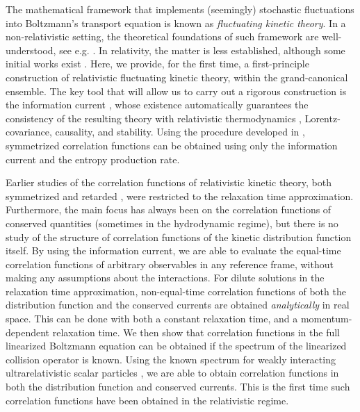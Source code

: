 \documentclass[aps,prd,preprint,nofootinbib,amsmath,amssymb,showpacs,longbibliography,singlecolumn,superscriptaddress,10pt]{revtex4-1}
\theoremstyle{plain}
\theoremstyle{definition}
\begin{document}
The mathematical framework that implements (seemingly) stochastic fluctuations into Boltzmann's transport equation is known as \textit{fluctuating kinetic theory}. In a non-relativistic setting, the theoretical foundations of such framework are well-understood, see e.g. \cite{landau10, fox1970contributions, Bixon:1969zz}. In relativity, the matter is less established, although some initial works exist \cite{Gavin:2016nir, Miron-Granese:2020mbf,Torrieri:2023thk}. Here, we provide, for the first time, a first-principle construction of relativistic fluctuating kinetic theory, within the grand-canonical ensemble. The key tool that will allow us to carry out a rigorous construction is the information current \cite{Gavassino:2021kjm}, whose existence automatically guarantees the consistency of the resulting theory with relativistic thermodynamics \cite{vanKampen1968,Noto_full,Israel_1981_review},  Lorentz-covariance, causality, and stability. Using the procedure developed in \cite{Mullins:2023tjg, Mullins:2023ott}, symmetrized correlation functions can be obtained using only the information current and the entropy production rate. 

Earlier studies of the correlation functions of relativistic kinetic theory, both symmetrized \cite{Gavin:2016nir, Miron-Granese:2020mbf} and retarded \cite{Romatschke:2015gic, Kurkela:2017xis, Bajec:2024jez}, were restricted to the relaxation time approximation. Furthermore, the main focus has always been on the correlation functions of conserved quantities (sometimes in the hydrodynamic regime), but there is no study of the structure of correlation functions of the kinetic distribution function itself. By using the information current, we are able to evaluate the equal-time correlation functions of arbitrary observables in any reference frame, without making any assumptions about the interactions. For dilute solutions in the relaxation time approximation, non-equal-time correlation functions of both the distribution function and the conserved currents are obtained \emph{analytically} in real space. This can be done with both a constant relaxation time, and a momentum-dependent relaxation time. We then show that correlation functions in the full linearized Boltzmann equation can be obtained if the spectrum of the linearized collision operator is known. Using the known spectrum for weakly interacting ultrarelativistic scalar particles \cite{Denicol:2022bsq}, we are able to obtain correlation functions in both the distribution function and conserved currents. This is the first time such correlation functions have been obtained in the relativistic regime. 
\end{document}
